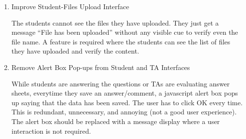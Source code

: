 \begin{enumerate}
\item Improve Student-Files Upload Interface

The students cannot see the files they have uploaded. They just get a message ``File has been uploaded'' without any visible cue to verify even the file name. A feature is required where the students can see the list of files they have uploaded and verify the content.

\item Remove Alert Box Pop-ups from Student and TA Interfaces

While students are answering the questions or TAs are evaluating answer sheets, everytime they save an answer/comment, a javascript alert box pops up saying that the data has been saved. The user has to click OK every time. This is redundant, unnecessary, and annoying (not a good user experience). The alert box should be replaced with a message display where a user interaction is not required.

\end{enumerate}

